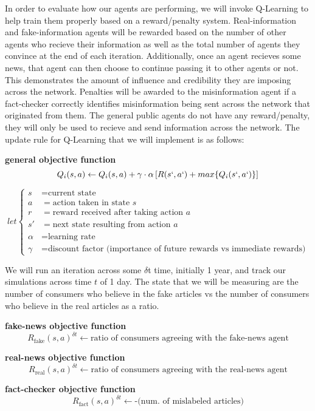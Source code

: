 \documentclass[12pt,twoside]{article}
\begin{document}
In order to evaluate how our agents are performing, we will invoke Q-Learning to help train them properly based on a reward/penalty system. Real-information and fake-information agents will be rewarded based on the number of other agents who recieve their information as well as the total number of agents they convince at the end of each iteration. Additionally, once an agent recieves some news, that agent can then choose to continue passing it to other agents or not. This demonstrates the amount of influence and credibility they are imposing across the network. Penalties will be awarded to the misinformation agent if a fact-checker correctly identifies misinformation being sent across the network that originated from them. The general public agents do not have any reward/penalty, they will only be used to recieve and send information across the network. The update rule for Q-Learning that we will implement is as follows:

\textbf{general objective function}
\[Q_{i}(s, a) \leftarrow Q_{i}(s, a) + \gamma \cdot \alpha  \left[R(s`, a`) + max \{Q_{i}(s`, a`)\}\right]\]

\[
let \left\{
\begin{aligned}
s & = \text{current state} \\
a & = \text{action taken in state } s \\
r & = \text{reward received after taking action } a \\
s' & = \text{next state resulting from action } a \\
\alpha & = \text{learning rate} \\
\gamma & = \text{discount factor (importance of future rewards vs immediate rewards)}
\end{aligned}
\right.
\]

We will run an iteration across some $\delta$t time, initially 1 year, and track our simulations across time $t$ of 1 day. The state that we will be measuring are the number of consumers who believe in the fake articles vs the number of consumers who believe in the real articles as a ratio.

\textbf{fake-news objective function}
\[R_{\text{fake}}(s, a)^{\delta t} \leftarrow \text{ratio of consumers agreeing with the fake-news agent}
\]

\textbf{real-news objective function}
\[R_{\text{real}}(s, a)^{\delta t} \leftarrow \text{ratio of consumers agreeing with the real-news agent}
\]

\textbf{fact-checker objective function}
\[R_{\text{fact}}(s, a)^{\delta t} \leftarrow \text{-(num. of mislabeled articles)}
\]
\end{document}
